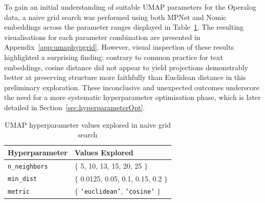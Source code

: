 \documentclass[10pt,oneside]{report}
\begin{document}
To gain an initial understanding of suitable UMAP parameters for the Operalog data, a naive grid search was performed using both MPNet and Nomic embeddings across the parameter ranges displayed in Table~\ref{tab:umapgrid}. The resulting visualisations for each parameter combination are presented in Appendix~\ref{app:umaphypgrid}. However, visual inspection of these results highlighted a surprising finding: contrary to common practice for text embeddings, cosine distance did not appear to yield projections demonstrably better at preserving structure more faithfully than Euclidean distance in this preliminary exploration. These inconclusive and unexpected outcomes underscore the need for a more systematic hyperparameter optimisation phase, which is later detailed in Section~\ref{sec:hyperparameterOpt}.

\begin{table}[htbp]
    \fontsize{8}{11}\selectfont %
    \centering
    \renewcommand{\arraystretch}{1.2} %
    \begin{tabular}{p{3cm}|p{8.5cm}} %
        \toprule %
        \textbf{Hyperparameter} & \textbf{Values Explored} \\ %
        \midrule %
        \texttt{n\_neighbors} & $\big\{$ 5, 10, 13, 15, 20, 25 $\big\}$ \\ %
        \texttt{min\_dist}    & $\big\{$ 0.0125, 0.05, 0.1, 0.15, 0.2 $\big\}$\\ %
        \texttt{metric}       & $\big\{$ \texttt{'euclidean'}, \texttt{'cosine'} $\big\}$\\ %
        \bottomrule %
    \end{tabular}
    \renewcommand{\arraystretch}{1.0} %
    \caption{UMAP hyperparameter values explored in naive grid search} %
    \label{tab:umapgrid} %
\end{table}


\end{document}
